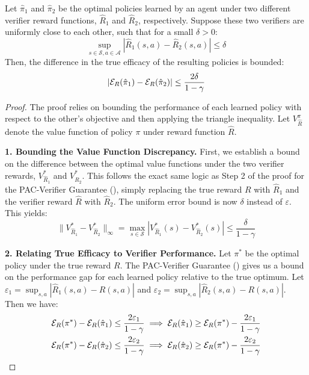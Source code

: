 \begin{lemma}
\label{lem:verifier_smoothness}
Let $\hat{\pi}_1$ and $\hat{\pi}_2$ be the optimal policies learned by an agent under two different verifier reward functions, $\hat{R}_1$ and $\hat{R}_2$, respectively. Suppose these two verifiers are uniformly close to each other, such that for a small $\delta > 0$:
\[ \sup_{s \in \mathcal{S}, a \in \mathcal{A}} |\hat{R}_1(s,a) - \hat{R}_2(s,a)| \le \delta \]
Then, the difference in the true efficacy of the resulting policies is bounded:
\[ |\mathcal{E}_R(\hat{\pi}_1) - \mathcal{E}_R(\hat{\pi}_2)| \le \frac{2\delta}{1-\gamma} \]
\end{lemma}
\begin{proof}
The proof relies on bounding the performance of each learned policy with respect to the other's objective and then applying the triangle inequality. Let $V^{\pi}_{\hat{R}}$ denote the value function of policy $\pi$ under reward function $\hat{R}$.

\noindent\textbf{1. Bounding the Value Function Discrepancy.}
First, we establish a bound on the difference between the optimal value functions under the two verifier rewards, $V^*_{\hat{R}_1}$ and $V^*_{\hat{R}_2}$. This follows the exact same logic as Step 2 of the proof for the PAC-Verifier Guarantee (), simply replacing the true reward $R$ with $\hat{R}_1$ and the verifier reward $\hat{R}$ with $\hat{R}_2$. The uniform error bound is now $\delta$ instead of $\varepsilon$. This yields:
\[ \|V^*_{\hat{R}_1} - V^*_{\hat{R}_2}\|_{\infty} = \max_{s \in \mathcal{S}} |V^*_{\hat{R}_1}(s) - V^*_{\hat{R}_2}(s)| \le \frac{\delta}{1-\gamma} \]

\noindent\textbf{2. Relating True Efficacy to Verifier Performance.}
Let $\pi^*$ be the optimal policy under the true reward $R$. The PAC-Verifier Guarantee () gives us a bound on the performance gap for each learned policy relative to the true optimum. Let $\varepsilon_1 = \sup_{s,a} |\hat{R}_1(s,a) - R(s,a)|$ and $\varepsilon_2 = \sup_{s,a} |\hat{R}_2(s,a) - R(s,a)|$. Then we have:
\begin{align*}
\mathcal{E}_R(\pi^*) - \mathcal{E}_R(\hat{\pi}_1) &\le \frac{2\varepsilon_1}{1-\gamma} \implies \mathcal{E}_R(\hat{\pi}_1) \ge \mathcal{E}_R(\pi^*) - \frac{2\varepsilon_1}{1-\gamma} \\
\mathcal{E}_R(\pi^*) - \mathcal{E}_R(\hat{\pi}_2) &\le \frac{2\varepsilon_2}{1-\gamma} \implies \mathcal{E}_R(\hat{\pi}_2) \ge \mathcal{E}_R(\pi^*) - \frac{2\varepsilon_2}{1-\gamma}
\end{align*}


\end{proof}
